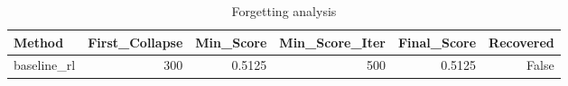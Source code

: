 \begin{table}[htbp]
\centering
\caption{Forgetting analysis}
\label{tab:forgetting}
\begin{tabular}{lrrrrr}
\toprule
\textbf{Method} & \textbf{First\_Collapse} & \textbf{Min\_Score} & \textbf{Min\_Score\_Iter} & \textbf{Final\_Score} & \textbf{Recovered} \\
\midrule
baseline\_rl & 300 & 0.5125 & 500 & 0.5125 & False \\
\bottomrule
\end{tabular}
\end{table}